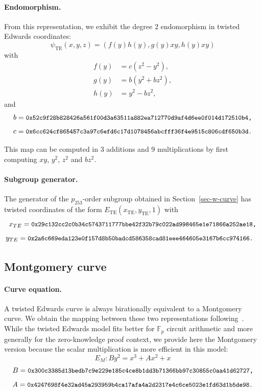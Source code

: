 \documentclass[version=preprint]{iacrcc}
\begin{document}
\paragraph{Endomorphism.}
From this representation, we exhibit the degree $2$ endomorphism in
twisted Edwards coordinates:
$$
\psi_\text{TE}(x,y,z) = \left(f(y)h(y), g(y)xy, h(y)xy\right)$$
with
\begin{align*}
  f(y) &= c(z^2-y^2),\\
  g(y) &= b(y^2+bz^2),\\
  h(y) &= y^2-bz^2,
\end{align*}
and
$$b = \text{{\small {\tt 0x52c9f28b828426a561f00d3a63511a882ea712770d9af4d6ee0f014d172510b4,}}}$$
$$c = \text{{\small {\tt 0x6cc624cf865457c3a97c6efd6c17d1078456abcfff36f4e9515c806cdf650b3d.}}}$$

This map can be computed in 3 additions and 9 multiplications by
first computing $xy$, $y^2$, $z^2$ and $bz^2$.

\paragraph{Subgroup generator.}
The generator of the $p_{253}$-order subgroup obtained in
Section~\ref{sec-w-curve} has twisted coordinates
of the form $E_\text{TE}(x_\text{TE},y_\text{TE},1)$ with
$$x_{TE} = \text{{\small{\tt 0x29c132cc2c0b34c5743711777bbe42f32b79c022ad998465e1e71866a252ae18,}}}$$
$$y_{TE} = \text{{\small{\tt 0x2a6c669eda123e0f157d8b50badcd586358cad81eee464605e3167b6cc974166.
}}}$$


\subsection{Montgomery curve}
\paragraph{Curve equation.}
A twisted Edwards curve is always birationally equivalent to a
Montgomery curve. We obtain the mapping between these two
representations following~\cite{JCEng:CosSmi18}.
While the twisted Edwards model fits better for $\mathbb F_p$ circuit
arithmetic and more generally for the zero-knowledge proof context, we
provide here the Montgomery version because the scalar multiplication
is more efficient in this model:
$$E_M: By^2 = x^3 + Ax^2 + x$$
$$B = \text{{\small {\tt 0x300c3385d13bedb7c9e229e185c4ce8b1dd3b71366bb97c30855c0aa41d62727,}}}$$
$$A = \text{{\small {\tt 0x4247698f4e32ad45a293959b4ca17afa4a2d2317e4c6ce5023e1fd63d1b5de98.}}}$$
\end{document}

